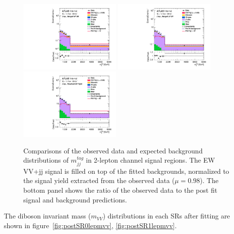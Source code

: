 \begin{figure}[]
    \centering
    \includegraphics[width=0.45\textwidth]{figures/PostFit/Region_distMTagMerJets_DSRVBSHP_BMin0_J0_incJet1_L2_T0_incFat1_Y6051_incTag1_Fat1_GlobalFit_unconditionnal_mu1log.pdf}
    \includegraphics[width=0.45\textwidth]{figures/PostFit/Region_distMTagMerJets_DSRVBSLP_BMin0_J0_incJet1_L2_T0_incFat1_Y6051_incTag1_Fat1_GlobalFit_unconditionnal_mu1log.pdf}
    \includegraphics[width=0.45\textwidth]{figures/PostFit/Region_distMTagResJets_DSRVBSFid_BMin0_T0_Y6051_incTag1_J2_L2_incJet1_GlobalFit_unconditionnal_mu1log.pdf}
    \caption{Comparisons of the observed data and expected background distributions of $m^{tag}_{jj}$ in 2-lepton channel signal regions. The EW VV+jj signal is filled on top of the fitted backgrounds, normalized to the signal yield extracted from the observed data ($\mu = 0.98$). The bottom panel shows the ratio of the observed data to the post fit signal and background predictions.}
    \label{fig:postSR2lepmtagjj}
\end{figure}
The diboson invariant mass ($m_{VV}$) distributions in each SRs after fitting are shown in figure~\ref{fig:postSR0lepmvv}, \ref{fig:postSR1lepmvv}.
